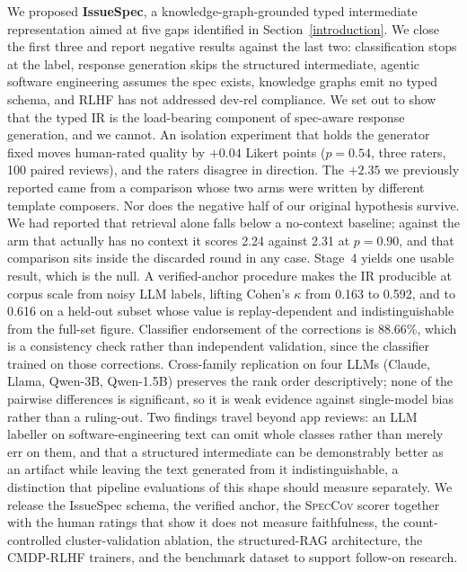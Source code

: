 \documentclass[preprint,12pt]{elsarticle}
\begin{document}
 
  We proposed \textbf{IssueSpec}, a knowledge-graph-grounded typed intermediate representation
  aimed at five gaps identified in Section~\ref{introduction}. We close the first three and
  report negative results against the last two:
  classification stops at the label, response generation skips the structured intermediate,
  agentic software engineering assumes the spec exists, knowledge graphs emit no typed schema,
  and RLHF has not addressed dev-rel compliance. We set out to show that the typed IR is the load-bearing component of spec-aware response
  generation, and we cannot. An isolation experiment that holds the generator fixed moves
  human-rated quality by $+0.04$ Likert points ($p = 0.54$, three raters, 100 paired reviews),
  and the raters disagree in direction. The $+2.35$ we previously reported came from a comparison
  whose two arms were written by different template composers. Nor does the negative half of our original hypothesis survive. We had reported that
  retrieval alone falls below a no-context baseline; against the arm that actually has no
  context it scores 2.24 against 2.31 at $p = 0.90$, and that comparison sits inside the
  discarded round in any case. Stage~4 yields one usable result, which is the null. A
  verified-anchor procedure makes the IR producible at corpus scale from noisy LLM labels,
  lifting Cohen's $\kappa$ from 0.163 to 0.592, and to 0.616 on a held-out subset whose value is
  replay-dependent and indistinguishable from the full-set figure. Classifier endorsement of the
  corrections is 88.66\%, which is a consistency check rather than independent validation, since
  the classifier trained on those corrections. Cross-family replication on four LLMs (Claude,
  Llama, Qwen-3B, Qwen-1.5B) preserves the rank order descriptively; none of the pairwise
  differences is significant, so it is weak evidence against single-model bias rather than a
  ruling-out. Two findings travel beyond app
  reviews: an LLM labeller on software-engineering text can omit whole classes rather than merely
  err on them, and that a structured intermediate can be demonstrably better as an artifact while
  leaving the text generated from it indistinguishable, a distinction that pipeline evaluations
  of this shape should measure separately. We release the IssueSpec schema, the verified anchor, the
  \textsc{SpecCov} scorer together with the human ratings that show it does not measure
  faithfulness, the count-controlled cluster-validation ablation, the
  structured-RAG architecture, the CMDP-RLHF trainers, and the benchmark dataset to support
  follow-on research.
\end{document}
